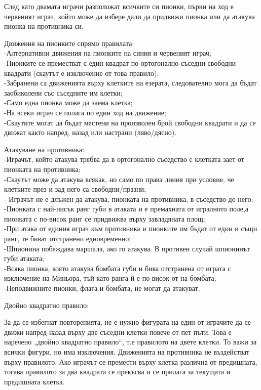 След като двамата играчи разположат всичките си пионки, първи на ход е червеният играч, който може да избере дали да придвижи пионка или да атакува пионка на противника си.

Движения на пионките спрямо правилата: \\
-Алтернативни движения на пионките на синия и червеният играч; \\
-Пионките се преместват с един квадрат по ортогонално съседни свободни квадрати (скаутът е изключение от това правило); \\
-Забранени са движенията върху клетките на езерата, следователно мога да бъдат заобиколени със съседните им клетки; \\
-Само една пионка може да заема клетка; \\
-На всеки играч се полага по един ход на движение; \\
-Скаутите могат да бъдат местени на произволен брой свободни квадрати и да се движат както напред, назад или настрани (ляво/дясно).

Атакуване на противника: \\
-Играчът, който атакува трябва да в ортогонално съседство с клетката зает от пионката на противника; \\
-Скаутът може да атакува всякак, но само по права линия  при условие, че клетките през и зад него са свободни/празни; \\
- Играчът не е длъжен да атакува, пионката на противника, в съседство до него; \\
-Пионката с най-нисък ранг губи в атаката и е премахната от игралното поле,а пионката с по-висок ранг се придвижва върху завладяната площ; \\
-При атака от единия играч към противника и пионките им бъдат от един и същи ранг, те биват отстранени едновременно; \\
-Шпионина побеждава маршала, ако го атакува. В противен случай шпионинът губи атаката; \\
-Всяка пионка, която атакува бомбата губи и бива отстранена от играта с изключение на Миньора, тъй като ранга й е по висок от на бомбата; \\
-Неподвижните пионки, флага и бомбата, не могат да атакуват.

Двойно квадратно правило:

За да се избегнат повторенията, не е нужно фигурата на един от играчите да се движи напред-назад върху две съседни клетки повече от пет пъти. Това е наречено „двойно квадратно правило“, т.е правилото на двете клетки. То важи за всички фигури, но има изключения. Движенията на противника не въздействат върху правилото. Ако играчът се премести върху клетка различна от предишната, тогава правилото за два квадрата се прекъсва и се прилага за текущата и предишната клетка.

